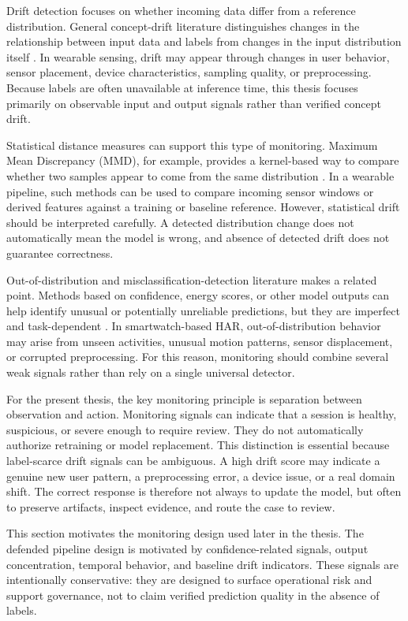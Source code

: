 Drift detection focuses on whether incoming data differ from a reference distribution. General concept-drift literature distinguishes changes in the relationship between input data and labels from changes in the input distribution itself \cite{gama2014survey,webb2016characterizing}. In wearable sensing, drift may appear through changes in user behavior, sensor placement, device characteristics, sampling quality, or preprocessing. Because labels are often unavailable at inference time, this thesis focuses primarily on observable input and output signals rather than verified concept drift.

Statistical distance measures can support this type of monitoring. Maximum Mean Discrepancy (MMD), for example, provides a kernel-based way to compare whether two samples appear to come from the same distribution \cite{gretton2012kernel}. In a wearable pipeline, such methods can be used to compare incoming sensor windows or derived features against a training or baseline reference. However, statistical drift should be interpreted carefully. A detected distribution change does not automatically mean the model is wrong, and absence of detected drift does not guarantee correctness.

Out-of-distribution and misclassification-detection literature makes a related point. Methods based on confidence, energy scores, or other model outputs can help identify unusual or potentially unreliable predictions, but they are imperfect and task-dependent \cite{hendrycks2017baseline,liu2020energy}. In smartwatch-based HAR, out-of-distribution behavior may arise from unseen activities, unusual motion patterns, sensor displacement, or corrupted preprocessing. For this reason, monitoring should combine several weak signals rather than rely on a single universal detector.

For the present thesis, the key monitoring principle is separation between observation and action. Monitoring signals can indicate that a session is healthy, suspicious, or severe enough to require review. They do not automatically authorize retraining or model replacement. This distinction is essential because label-scarce drift signals can be ambiguous. A high drift score may indicate a genuine new user pattern, a preprocessing error, a device issue, or a real domain shift. The correct response is therefore not always to update the model, but often to preserve artifacts, inspect evidence, and route the case to review.

This section motivates the monitoring design used later in the thesis. The defended pipeline design is motivated by confidence-related signals, output concentration, temporal behavior, and baseline drift indicators. These signals are intentionally conservative: they are designed to surface operational risk and support governance, not to claim verified prediction quality in the absence of labels.


